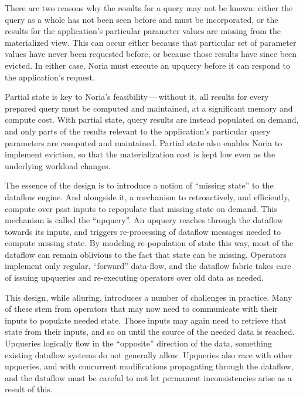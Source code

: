 There are two reasons why the results for a query may not be known: either the
query as a whole has not been seen before and must be incorporated, or the
results for the application's particular parameter values are missing from the
materialized view. This can occur either because that particular set of
parameter values have never been requested before, or because those results have
since been evicted. In either case, Noria must execute an upquery before it can
respond to the application's request.

Partial state is key to Noria's feasibility\,---\,without it, all results for
every prepared query must be computed and maintained, at a significant memory
and compute cost. With partial state, query results are instead populated on
demand, and only parts of the results relevant to the application's particular
query parameters are computed and maintained. Partial state also enables Noria
to implement eviction, so that the materialization cost is kept low even as the
underlying workload changes.

The essence of the design is to introduce a notion of ``missing state'' to the
dataflow engine. And alongside it, a mechanism to retroactively, and
efficiently, compute over past inputs to repopulate that missing state on
demand. This mechanism is called the ``upquery''. An upquery reaches through the
dataflow towards its inputs, and triggers re-processing of dataflow messages
needed to compute missing state. By modeling re-population of state this way,
most of the dataflow can remain oblivious to the fact that state can be missing.
Operators implement only regular, ``forward'' data-flow, and the dataflow fabric
takes care of issuing upqueries and re-executing operators over old data as
needed.

This design, while alluring, introduces a number of challenges in practice. Many
of these stem from operators that may now need to communicate with their inputs
to populate needed state. Those inputs may again need to retrieve that state
from their inputs, and so on until the source of the needed data is reached.
Upqueries logically flow in the ``opposite'' direction of the data, something
existing dataflow systems do not generally allow. Upqueries also race with other
upqueries, and with concurrent modifications propagating through the dataflow,
and the dataflow must be careful to not let permanent inconsistencies arise as a
result of this.

%
%

